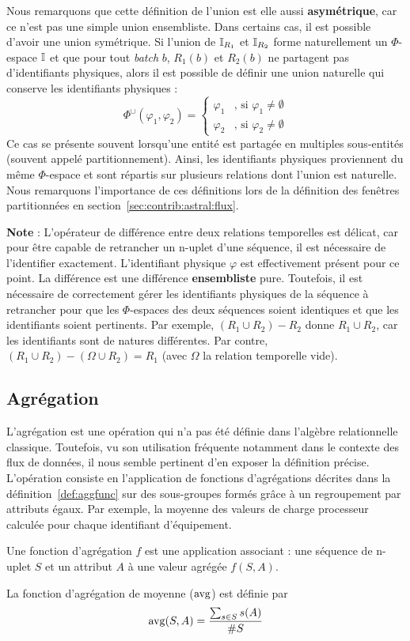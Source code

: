 Nous remarquons que cette définition de l'union est elle aussi \textbf{asymétrique}, car ce n'est pas une simple union ensembliste. Dans certains cas, il est possible d'avoir une union symétrique. Si l'union de $\mathbb{I}_{R_1}$ et $\mathbb{I}_{R_2}$ forme naturellement un $\Phi$-espace $\mathbb{I}$ et que pour tout \textit{batch} $b$, $R_1(b)$ et $R_2(b)$ ne partagent pas d'identifiants physiques, alors il est possible de définir une union naturelle qui conserve les identifiants physiques : $$\Phi^\cup(\varphi_1,\varphi_2) = \begin{cases} \varphi_1 & \textrm{, si }\varphi_1 \neq \emptyset \\\varphi_2 &\textrm{, si }\varphi_2 \neq \emptyset\end{cases}$$
Ce cas se présente souvent lorsqu'une entité est partagée en multiples sous-entités (souvent appelé partitionnement). Ainsi, les identifiants physiques proviennent du même $\Phi$-espace et sont répartis sur plusieurs relations dont l'union est naturelle. Nous remarquons l'importance de ces définitions lors de la définition des fenêtres partitionnées en section~\ref{sec:contrib:astral:flux}.

\textbf{Note} : L'opérateur de différence entre deux relations temporelles est délicat, car pour être capable de retrancher un n-uplet d'une séquence, il est nécessaire de l'identifier exactement. L'identifiant physique $\varphi$ est effectivement présent pour ce point. La différence est une différence \textbf{ensembliste} pure. Toutefois, il est nécessaire de correctement gérer les identifiants physiques de la séquence à retrancher pour que les $\Phi$-espaces des deux séquences soient identiques et que les identifiants soient pertinents. Par exemple, $(R_1\cup R_2)-R_2$ donne $R_1\cup R_2$, car les identifiants sont de natures différentes. Par contre, $(R_1\cup R_2)-(\Omega \cup R_2)=R_1$ (avec $\Omega$ la relation temporelle vide).

\subsection{Agrégation}
L'agrégation est une opération qui n'a pas été définie dans l'algèbre relationnelle classique. Toutefois, vu son utilisation fréquente notamment dans le contexte des flux de données, il nous semble pertinent d'en exposer la définition précise. L'opération consiste en l'application de fonctions d'agrégations décrites dans la définition~\ref{def:aggfunc} sur des sous-groupes formés grâce à un regroupement par attributs égaux. Par exemple, la moyenne des valeurs de charge processeur calculée pour chaque identifiant d'équipement. 
\begin{defi}\label{def:aggfunc}
    Une fonction d'agrégation $f$ est une application associant : une séquence de n-uplet $S$ et un attribut $A$ à une valeur agrégée $f(S,A)$.
\end{defi}
\begin{example}
    La fonction d'agrégation de moyenne ($\mathrm{avg}$) est définie par $$\mathrm{avg}(S,A) = \frac{\sum_{s\in S} s(A)}{\# S}$$
\end{example}

